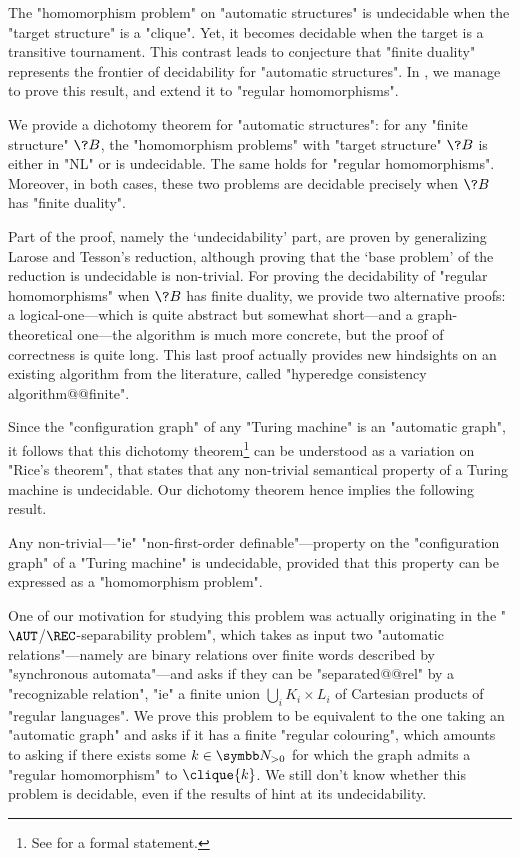The "homomorphism problem" on "automatic structures" 
is undecidable when the "target structure" is a "clique".
Yet, it becomes decidable when the target is a transitive tournament.
This contrast leads to conjecture that "finite duality" represents the frontier of decidability for "automatic structures". In , we manage to prove this result, and extend it to "regular homomorphisms".

\begin{contribution}
	We provide a dichotomy theorem for "automatic structures":
	for any "finite structure" $\?B$, the "homomorphism problems" with "target structure" $\?B$
	is either in "NL" or is undecidable. The same holds for "regular homomorphisms".
	Moreover, in both cases, these two problems are decidable precisely when $\?B$ has "finite duality".
\end{contribution}

Part of the proof, namely the `undecidability' part, are proven
by generalizing Larose and Tesson's reduction, although proving that the
`base problem' of the reduction is undecidable is non-trivial.
For proving the decidability of "regular homomorphisms" when $\?B$ has finite duality,
we provide two alternative proofs: a logical-one---which is quite abstract but somewhat short---and
a graph-theoretical one---the algorithm is much more concrete, but the proof of correctness is 
quite long. This last proof actually provides new hindsights on an existing algorithm from the literature, called "hyperedge consistency algorithm@@finite".

Since the "configuration graph" of any "Turing machine" is an "automatic graph",
it follows that this dichotomy theorem\footnote{See  for a formal statement.} can be understood
as a variation on "Rice's theorem", that states that any non-trivial
semantical property of a Turing machine is undecidable.
Our dichotomy theorem hence implies the following result.

\begin{contribution}
	Any non-trivial---"ie" "non-first-order definable"---property on the "configuration graph"
	of a "Turing machine" is undecidable, provided that this property can be expressed
	as a "homomorphism problem".
\end{contribution}

One of our motivation for studying this problem was actually originating
in the "$\AUT$/$\REC$-separability problem", which takes as input two "automatic relations"---namely are binary relations over finite words described by "synchronous automata"---and asks if they can be
"separated@@rel" by a "recognizable relation", "ie" a finite union $\bigcup_i K_i \times L_i$
of Cartesian products of "regular languages". 
We prove this problem to be equivalent to the one taking an "automatic graph" and asks
if it has a finite "regular colouring", which amounts to asking
if there exists some $k\in\Np$ for which the graph admits a "regular homomorphism" to
$\clique{k}$. We still don't know whether this problem is decidable, 
even if the results of  hint at its undecidability.

